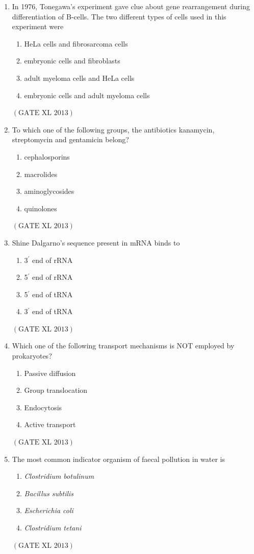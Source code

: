 \documentclass[12pt]{article}
\theoremstyle{remark}
\providecommand{\brak}[1]{\ensuremath{\left(#1\right)}}
\begin{document}
\begin{enumerate}
\item In 1976, Tonegawa’s experiment gave clue about gene rearrangement during differentiation of B-cells. The two different types of cells used in this experiment were
\begin{enumerate}
\item HeLa cells and fibrosarcoma cells
\item embryonic cells and fibroblasts
\item adult myeloma cells and HeLa cells
\item embryonic cells and adult myeloma cells
\end{enumerate}
\hfill $\brak{\text{GATE XL 2013}}$

\item To which one of the following groups, the antibiotics kanamycin, streptomycin and gentamicin belong?
\begin{enumerate}
\item cephalosporins
\item macrolides
\item aminoglycosides
\item quinolones
\end{enumerate}
\hfill $\brak{\text{GATE XL 2013}}$

\item Shine Dalgarno’s sequence present in mRNA binds to
\begin{enumerate}
\item 3$^{\prime}$ end of rRNA
\item 5$^{\prime}$ end of rRNA
\item 5$^{\prime}$ end of tRNA
\item 3$^{\prime}$ end of tRNA
\end{enumerate}
\hfill $\brak{\text{GATE XL 2013}}$

\item Which one of the following transport mechanisms is NOT employed by prokaryotes?
\begin{enumerate}
\item Passive diffusion
\item Group translocation
\item Endocytosis
\item Active transport
\end{enumerate}
\hfill $\brak{\text{GATE XL 2013}}$

\item The most common indicator organism of faecal pollution in water is
\begin{enumerate}
\item \textit{Clostridium botulinum}
\item \textit{Bacillus subtilis}
\item \textit{Escherichia coli}
\item \textit{Clostridium tetani}
\end{enumerate}
\hfill $\brak{\text{GATE XL 2013}}$


\end{enumerate}
\end{document}
